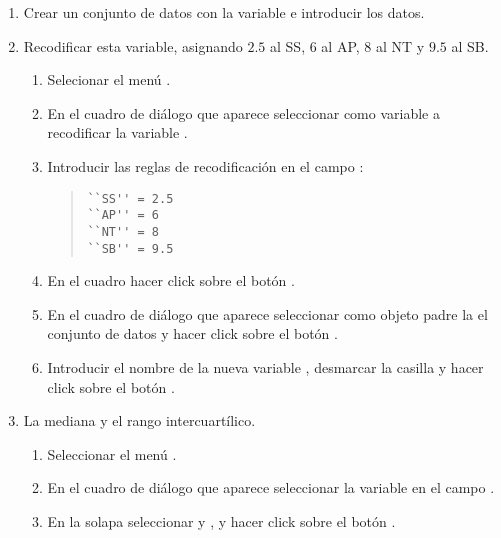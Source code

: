 \begin{enumerate}[leftmargin=*]
\begin{enumerate}
\item  Crear un conjunto de datos  con la variable  e introducir los datos.

\item  Recodificar esta variable, asignando $2.5$ al SS, $6$ al AP, $8$ al NT y $9.5$ al SB.
\begin{indicacion}{
\begin{enumerate}
\item Selecionar el menú .
\item En el cuadro de diálogo que aparece seleccionar como variable a recodificar la variable .
\item Introducir las reglas de recodificación en el campo :
\begin{quote}
\lstinline{``SS'' = 2.5}\\
\lstinline{``AP'' = 6}\\
\lstinline{``NT'' = 8}\\
\lstinline{``SB'' = 9.5}
\end{quote}
\item En el cuadro  hacer click sobre el botón .
\item En el cuadro de diálogo que aparece seleccionar como objeto padre la el conjunto de datos  y hacer click sobre el botón .
\item Introducir el nombre de la nueva variable , desmarcar la casilla  y hacer click sobre el botón .
\end{enumerate}}
\end{indicacion}

\item La mediana y el rango intercuartílico.
\begin{indicacion}{
\begin{enumerate}
\item Seleccionar el menú .
\item En el cuadro de diálogo que aparece seleccionar la variable  en el campo .
\item En la solapa  seleccionar  y , 
y hacer click sobre el botón .
\end{enumerate}}
\end{indicacion}
\end{enumerate}


\end{enumerate}
